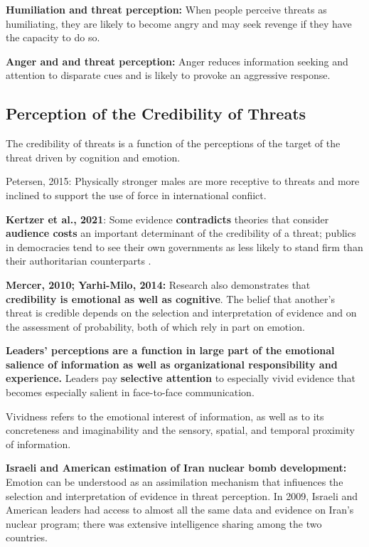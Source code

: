 \textbf{Humiliation and threat perception: } When people perceive threats as humiliating, they are likely to become angry and may seek revenge if they have the capacity to do so.

\textbf{Anger and and threat perception:} Anger reduces information seeking and attention to disparate cues and is likely to provoke an aggressive response.

\subsection{Perception of the Credibility of Threats}
The credibility of threats is a function of the perceptions of the target of the threat driven by cognition and emotion.

Petersen, 2015: Physically stronger males are more receptive to threats and more inclined to support the use of force in international confiict.

\textbf{Kertzer et al., 2021}: Some evidence \textbf{contradicts} theories that consider \textbf{audience costs} an important determinant of the credibility of a threat; publics in democracies tend to see their own governments as less likely to stand firm than their authoritarian counterparts .

\textbf{Mercer, 2010; Yarhi-Milo, 2014:} Research also demonstrates that \textbf{credibility is emotional as well as cognitive}. The belief that another’s threat is credible depends on the selection and interpretation of evidence and on the assessment of probability, both of which rely in part on emotion.

\textbf{Leaders’ perceptions are a function in large part of the emotional salience of information as well as organizational responsibility and experience.} Leaders pay \textbf{selective attention} to especially vivid evidence that becomes especially salient in face-to-face communication.

Vividness refers to the emotional interest of information, as well as to its concreteness and imaginability and the sensory, spatial, and temporal proximity of information.

\textbf{Israeli and American estimation of Iran nuclear bomb development:} Emotion can be understood as an assimilation mechanism that infiuences the selection and interpretation of evidence in threat perception. In 2009, Israeli and American leaders had access to almost all the same data and evidence on Iran’s nuclear program; there was extensive intelligence sharing among the two countries.

